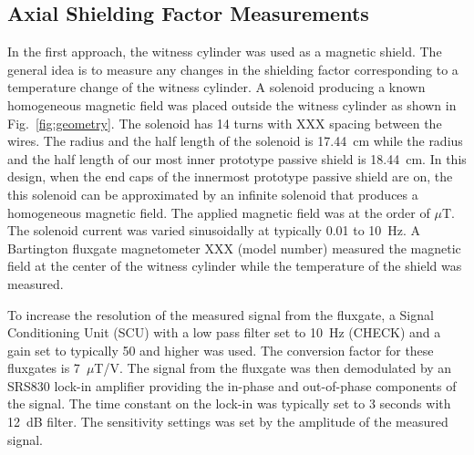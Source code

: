\documentclass[review]{elsarticle}
\begin{document}
\subsection{Axial Shielding Factor Measurements}
In the first approach, the witness cylinder was used as a magnetic
shield.  The general idea is to measure any changes in the shielding
factor corresponding to a temperature change of the witness cylinder.
A solenoid producing a known homogeneous magnetic field was placed
outside the witness cylinder as shown in Fig.~\ref{fig:geometry}.  The
solenoid has 14 turns with XXX spacing between the wires. The radius
and the half length of the solenoid is 17.44~cm while the radius and
the half length of our most inner prototype passive shield is
18.44~cm. In this design, when the end caps of the innermost prototype
passive shield are on, the this solenoid can be approximated by an
infinite solenoid that produces a homogeneous magnetic field.  The
applied magnetic field was at the order of $\mu$T.  The solenoid
current was varied sinusoidally at typically 0.01 to 10~Hz.  A
Bartington fluxgate magnetometer XXX (model number) measured the
magnetic field at the center of the witness cylinder while the
temperature of the shield was measured.

To increase the resolution of the measured signal from the fluxgate, a
Signal Conditioning Unit (SCU) with a low pass filter set to 10~Hz
(CHECK) and a gain set to typically 50 and higher was used. The
conversion factor for these fluxgates is 7~$\mu$T/V.  The signal from
the fluxgate was then demodulated by an SRS830 lock-in
amplifier providing the in-phase and out-of-phase components of the
signal. The time constant on the lock-in was typically set to 3
seconds with 12~dB filter. The sensitivity settings was set by the
amplitude of the measured signal.
\end{document}
